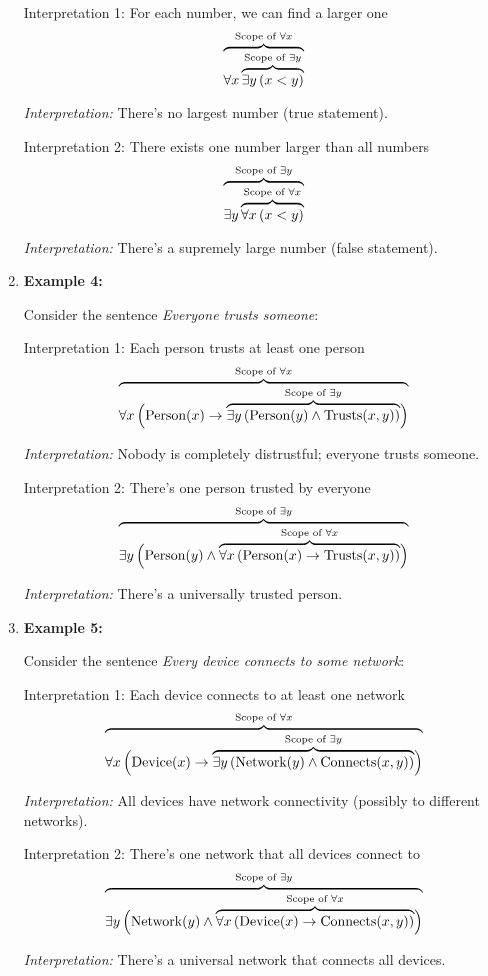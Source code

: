 \documentclass[12pt,a4paper,openany]{article}
\begin{document}
\begin{enumerate}
  Interpretation 1: For each number, we can find a larger one \[
   {\color{black}\overbrace{\color{black}\forall x \,
   {\color{black}\overbrace{\color{black}\exists y \, (x < y)}^{\color{black}\text{Scope of } \exists y}} 
   }^{\color{black}\text{Scope of } \forall x}}
   \]

  \emph{Interpretation:} There's no largest number (true statement).

  Interpretation 2: There exists one number larger than all numbers \[
   {\color{black}\overbrace{\color{black}\exists y \,
   {\color{black}\overbrace{\color{black}\forall x \, (x < y)}^{\color{black}\text{Scope of } \forall x}}
   }^{\color{black}\text{Scope of } \exists y}}
   \]

  \emph{Interpretation:} There's a supremely large number (false
  statement).
\item
  \textbf{Example 4:}

  Consider the sentence \emph{Everyone trusts someone}:

  Interpretation 1: Each person trusts at least one person \[
   {\color{black}\overbrace{\color{black}\forall x \, \Big(
   \text{Person}(x) \to
   {\color{black}\overbrace{\color{black}\exists y \, (\text{Person}(y) \wedge \text{Trusts}(x,y))}^{\color{black}\text{Scope of } \exists y}}
   \Big)}^{\color{black}\text{Scope of } \forall x}}
   \]

  \emph{Interpretation:} Nobody is completely distrustful; everyone
  trusts someone.

  Interpretation 2: There's one person trusted by everyone \[
   {\color{black}\overbrace{\color{black}\exists y \,
   \Big(
   \text{Person}(y) \wedge
   {\color{black}\overbrace{\color{black}\forall x \, 
   ( \text{Person}(x) \to \text{Trusts}(x,y) )
   }^{\color{black}\text{Scope of } \forall x}}
   \Big)
   }^{\color{black}\text{Scope of } \exists y}}
   \]

  \emph{Interpretation:} There's a universally trusted person.
\item
  \textbf{Example 5:}

  Consider the sentence \emph{Every device connects to some network}:

  Interpretation 1: Each device connects to at least one network \[
   {\color{black}\overbrace{\color{black}\forall x \, \Big(
   \text{Device}(x) \to
   {\color{black}\overbrace{\color{black}\exists y \, (\text{Network}(y) \wedge \text{Connects}(x,y))}^{\color{black}\text{Scope of } \exists y}}
   \Big)}^{\color{black}\text{Scope of } \forall x}}
   \]

  \emph{Interpretation:} All devices have network connectivity (possibly
  to different networks).

  Interpretation 2: There's one network that all devices connect to \[
   {\color{black}\overbrace{\color{black}\exists y \,
   \Big(
   \text{Network}(y) \wedge
   {\color{black}\overbrace{\color{black}\forall x \,
   ( \text{Device}(x) \to \text{Connects}(x,y) )
   }^{\color{black}\text{Scope of } \forall x}}
   \Big)
   }^{\color{black}\text{Scope of } \exists y}}
   \]

  \emph{Interpretation:} There's a universal network that connects all
  devices.
\end{enumerate}
\end{document}

